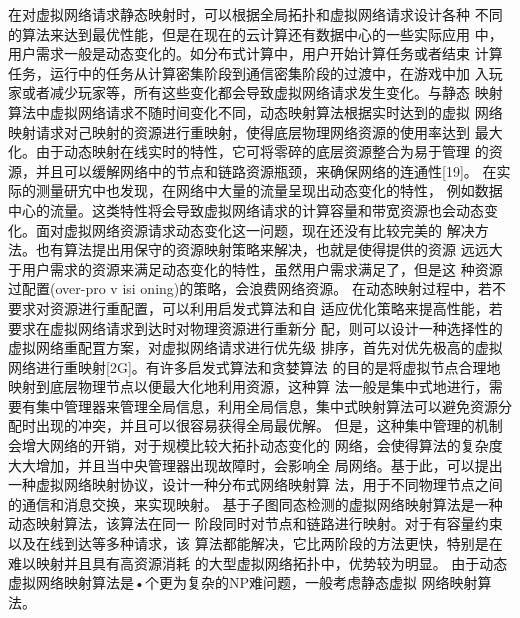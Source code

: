 在对虚拟网络请求静态映射时，可以根据全局拓扑和虚拟网络请求设计各种 不同的算法来达到最优性能，但是在现在的云计算还有数据中心的一些实际应用 中，用户需求一般是动态变化的。如分布式计算中，用户开始计算任务或者结束 计算任务，运行中的任务从计算密集阶段到通信密集阶段的过渡中，在游戏中加 入玩家或者减少玩家等，所有这些变化都会导致虚拟网络请求发生变化。与静态 映射算法中虚拟网络请求不随时间变化不同，动态映射算法根据实时达到的虚拟 网络映射请求对己映射的资源进行重映射，使得底层物理网络资源的使用率达到 最大化。由于动态映射在线实时的特性，它可将零碎的底层资源整合为易于管理 的资源，并且可以缓解网络中的节点和链路资源瓶颈，来确保网络的连通性[19]。
在实际的测量研宄中也发现，在网络中大量的流量呈现出动态变化的特性， 例如数据中心的流量。这类特性将会导致虚拟网络请求的计算容量和带宽资源也会动态变化。面对虚拟网络资源请求动态变化这一问题，现在还没有比较完美的 解决方法。也有算法提出用保守的资源映射策略来解决，也就是使得提供的资源 远远大于用户需求的资源来满足动态变化的特性，虽然用户需求满足了，但是这 种资源过配置(over-pro v isi oning)的策略，会浪费网络资源。
在动态映射过程中，若不要求对资源进行重配置，可以利用启发式算法和自 适应优化策略来提高性能，若要求在虚拟网络请求到达时对物理资源进行重新分 配，则可以设计一种选择性的虚拟网络重配罝方案，对虚拟网络请求进行优先级 排序，首先对优先极高的虚拟网络进行重映射[2G]。有许多启发式算法和贪婪算法 的目的是将虚拟节点合理地映射到底层物理节点以便最大化地利用资源，这种算 法一般是集中式地进行，需要有集中管理器来管理全局信息，利用全局信息，集中式映射算法可以避免资源分配时出现的冲突，并且可以很容易获得全局最优解。 但是，这种集中管理的机制会增大网络的开销，对于规模比较大拓扑动态变化的 网络，会使得算法的复杂度大大增加，并且当中央管理器出现故障时，会影响全 局网络。基于此，可以提出一种虚拟网络映射协议，设计一种分布式网络映射算 法，用于不同物理节点之间的通信和消息交换，来实现映射。
基于子图同态检测的虚拟网络映射算法是一种动态映射算法，该算法在同一 阶段同时对节点和链路进行映射。对于有容量约束以及在线到达等多种请求，该 算法都能解决，它比两阶段的方法更快，特别是在难以映射并且具有高资源消耗 的大型虚拟网络拓扑中，优势较为明显。
由于动态虚拟网络映射算法是•个更为复杂的NP难问题，一般考虑静态虚拟 网络映射算法。



